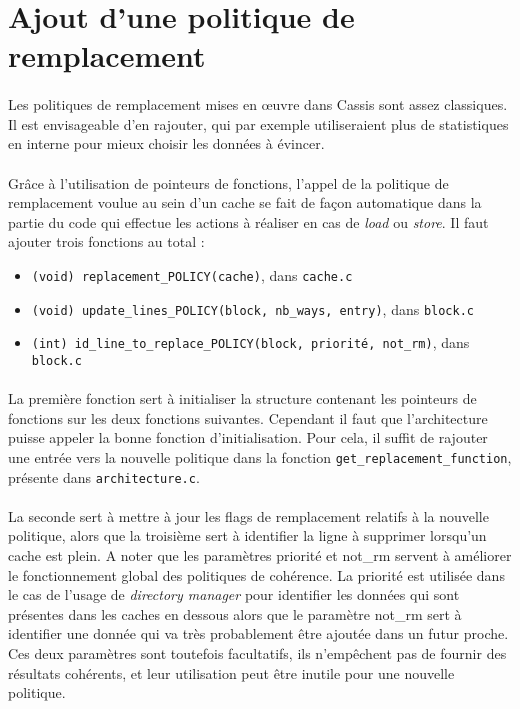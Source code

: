 \section{Ajout d'une politique de remplacement}

\paragraph{}
Les politiques de remplacement mises en {\oe}uvre dans \textsf{Cassis} sont assez classiques. Il est envisageable d'en rajouter, qui par exemple utiliseraient plus de statistiques en interne pour mieux choisir les données à évincer.

\paragraph{}
Grâce à l'utilisation de pointeurs de fonctions, l'appel de la politique de remplacement voulue au sein d'un cache se fait de façon automatique dans la partie du code qui effectue les actions à réaliser en cas de \emph{load} ou \emph{store}. Il faut ajouter trois fonctions au total :
\begin{itemize}
\item \texttt{(void) replacement\_POLICY(cache)}, dans \texttt{cache.c}
\item \texttt{(void) update\_lines\_POLICY(block, nb\_ways, entry)}, dans \texttt{block.c}
\item \texttt{(int) id\_line\_to\_replace\_POLICY(block, priorité, not\_rm)}, dans \texttt{block.c}
\end{itemize}

\paragraph{}
La première fonction sert à initialiser la structure contenant les pointeurs de fonctions sur les deux fonctions suivantes. Cependant il faut que l'architecture puisse appeler la bonne fonction d'initialisation. Pour cela, il suffit de rajouter une entrée vers la nouvelle politique dans la fonction \texttt{get\_replacement\_function}, présente dans \texttt{architecture.c}.

\paragraph{}
La seconde sert à mettre à jour les flags de remplacement relatifs à la nouvelle politique, alors que la troisième sert à identifier la ligne à supprimer lorsqu'un cache est plein. A noter que les paramètres priorité et not\_rm servent à améliorer le fonctionnement global des politiques de cohérence. La priorité est utilisée dans le cas de l'usage de \emph{directory manager} pour identifier les données qui sont présentes dans les caches en dessous alors que le paramètre not\_rm sert à identifier une donnée qui va très probablement être ajoutée dans un futur proche. Ces deux paramètres sont toutefois facultatifs, ils n'empêchent pas de fournir des résultats cohérents, et leur utilisation peut être inutile pour une nouvelle politique.

